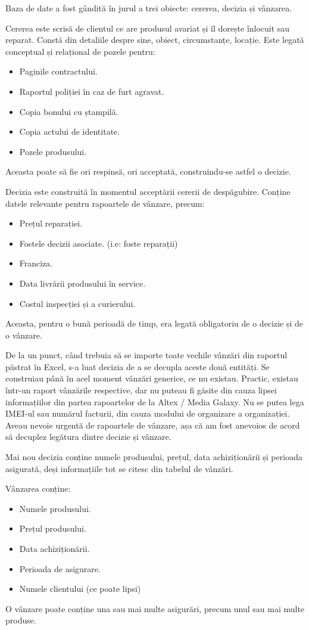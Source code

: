 Baza de date a fost gândită în jurul a trei obiecte: cererea, decizia și vânzarea.

Cererea este scrisă de clientul ce are produsul avariat și îl dorește înlocuit sau reparat.
Constă din detaliile despre sine, obiect, circumstanțe, locație.
Este legată conceptual și relațional de pozele pentru:
\begin{itemize}
	\item Paginile contractului.
	\item Raportul poliției în caz de furt agravat.
	\item Copia bonului cu ștampilă.
	\item Copia actului de identitate.
	\item Pozele produsului.
\end{itemize}
Aceasta poate să fie ori respinsă, ori acceptată, construindu-se astfel o decizie.

Decizia este construită în momentul acceptării cererii de despăgubire.
Conține datele relevante pentru rapoartele de vânzare, precum:
\begin{itemize}
	\item Prețul reparației.
	\item Fostele decizii asociate. (i.e: foste reparații)
	\item Franciza.
	\item Data livrării produsului în service.
	\item Costul inspecției și a curierului.
\end{itemize}
Aceasta, pentru o bună perioadă de timp, era legată obligatoriu de o decizie și de o vânzare.

De la un punct, când trebuia să se importe toate vechile vânzări din raportul păstrat în Excel, s-a luat decizia de a se decupla aceste două entități.
Se construiau până în acel moment vânzări generice, ce nu existau.
Practic, existau într-un raport vânzările respective, dar nu puteau fi găsite din cauza lipsei informațiilor din partea rapoartelor de la Altex / Media Galaxy.
Nu se putea lega IMEI-ul sau numărul facturii, din cauza modului de organizare a organizației.
Aveau nevoie urgentă de rapoartele de vânzare, așa că am fost anevoios de acord să decuplez legătura dintre decizie și vânzare.

Mai nou decizia conține numele produsului, prețul, data achiziționării și perioada asigurată, deși informațiile tot se citesc din tabelul de vânzări.

Vânzarea conține:
\begin{itemize}
	\item Numele produsului.
	\item Prețul produsului.
	\item Data achiziționării.
	\item Perioada de asigurare.
	\item Numele clientului (ce poate lipsi)
\end{itemize}
O vânzare poate conține una sau mai multe asigurări, precum unul sau mai multe produse.



